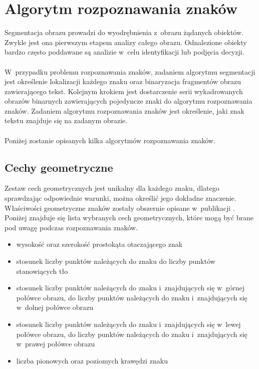 \section{Algorytm rozpoznawania znaków}\label{sec:ocr}
Segmentacja obrazu prowadzi do wyodrębnienia z~obrazu żądanych obiektów. Zwykle jest ona pierwszym etapem analizy całego obrazu. Odnalezione obiekty bardzo często poddawane są analizie w~celu identyfikacji lub podjęcia decyzji.
\paragraph{}
 W~przypadku problemu rozpoznawania znaków, zadaniem algorytmu segmentacji jest określenie lokalizacji każdego znaku oraz binaryzacja fragmentów obrazu zawierającego tekst. Kolejnym krokiem jest dostarczenie serii wykadrowanych obrazów binarnych zawierających pojedyncze znaki do algorytmu rozpoznawania znaków. Zadaniem algorytmu rozpoznawania znaków jest określenie, jaki znak tekstu znajduje się na zadanym obrazie.
\paragraph{}
Poniżej zostanie opisanych kilka algorytmów rozpoznawania znaków.
\subsection{Cechy geometryczne}
Zestaw cech geometrycznych jest unikalny dla każdego znaku, dlatego sprawdzając odpowiednie warunki, można określić jego dokładne znaczenie. Właściwości geometryczne znaków zostały obszernie opisane w~publikacji \cite{frey91}. Poniżej znajduje się lista wybranych cech geometrycznych, które mogą być brane pod uwagę podczas rozpoznawania znaków.
\begin{itemize}
  \item wysokość oraz szerokość prostokąta otaczającego znak
  \item stosunek liczby punktów należących do znaku do liczby punktów stanowiących tło
  \item stosunek liczby punktów należących do znaku i~znajdujących się w~górnej połówce obrazu, do liczby punktów należących do znaku i~znajdujących się w~dolnej połówce obrazu
    \item stosunek liczby punktów należących do znaku i~znajdujących się w~lewej połówce  obrazu, do liczby punktów należących do znaku i~znajdujących się w~prawej połówce obrazu
    \item liczba pionowych oraz poziomych krawędzi znaku
\end{itemize}
